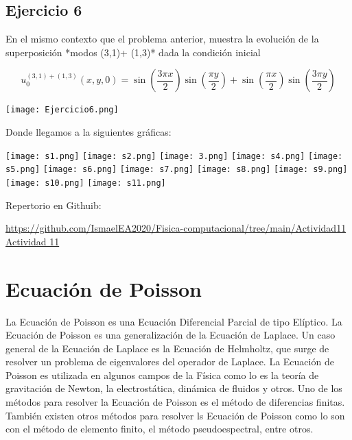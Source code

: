 \documentclass[12pt]{article}
\begin{document}


\subsection{Ejercicio 6}

En el mismo contexto que el problema anterior, muestra la evolución de la superposición *modos (3,1)+ (1,3)* dada la condición inicial

\begin{equation*}
u_0^{(3,1)+(1,3)}(x,y,0) = \sin (\frac{3 \pi x}{2}) \sin (\frac{\pi y}{2}) + \sin (\frac{\pi x}{2}) \sin (\frac{3 \pi y}{2})
\end{equation*}

\begin{center}
    \texttt{[image: Ejercicio6.png]}
    
    Donde llegamos a la siguientes gráficas:
    
    \texttt{[image: s1.png]}
    \texttt{[image: s2.png]}
    \texttt{[image: 3.png]}
    \texttt{[image: s4.png]}
    \texttt{[image: s5.png]}
    \texttt{[image: s6.png]}
    \texttt{[image: s7.png]}
    \texttt{[image: s8.png]}
    \texttt{[image: s9.png]}
    \texttt{[image: s10.png]}
    \texttt{[image: s11.png]}

    
\end{center}

\begin{center}
    Repertorio en Githuib:
    
    \url{https://github.com/IsmaelEA2020/Fisica-computacional/tree/main/Actividad11}
\href{http://www.latex-project.org/}{Actividad 11}

\end{center}



\section{Ecuación de Poisson}

La Ecuación de Poisson es una Ecuación Diferencial Parcial de tipo Elíptico. La Ecuación de Poisson es una generalización de la Ecuación de Laplace. Un caso general de la Ecuación de Laplace es la Ecuación de Helmholtz, que surge de resolver un problema de eigenvalores del operador de Laplace. La Ecuación de Poisson es utilizada en algunos campos de la Física como lo es la teoría de gravitación de Newton, la electrostática, dinámica de fluidos y otros. Uno de los métodos para resolver la Ecuación de Poisson es el método de diferencias finitas. También existen otros métodos para resolver ls Ecuación de Poisson como lo son con el método de elemento finito, el método pseudoespectral, entre otros. 
\end{document}
